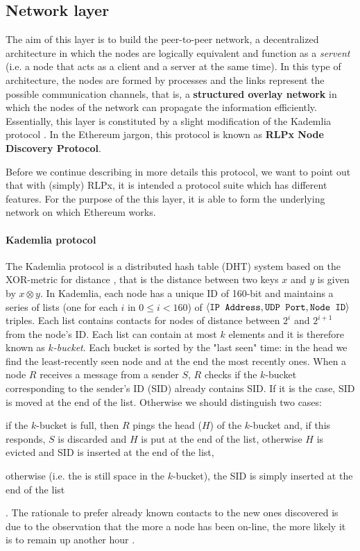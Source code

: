 \subsection{Network layer}
\label{sec:network-layer}

The aim of this layer is to build the peer-to-peer network, a decentralized
architecture in which the nodes are logically equivalent and function as a
\emph{servent} (i.e. a node that acts as a client and a server at the same
time). In this type of architecture, the nodes are formed by processes and the
links represent the possible communication channels, that is, a
\textbf{structured overlay network} \cite{van2017distributed} in which the nodes
of the network can propagate the information efficiently. Essentially, this
layer is constituted by a slight modification of the Kademlia protocol
\cite{bib:kademlia}. In the Ethereum jargon, this protocol is known as
\textbf{RLPx Node Discovery Protocol}.

Before we continue describing in more details this protocol, we want to point
out that with (simply) RLPx, it is intended a protocol suite which has different
features. For the purpose of the this layer, it is able to form the underlying
network on which Ethereum works.

\paragraph{Kademlia protocol}
The Kademlia protocol is a distributed hash table (DHT) system based on the
XOR-metric for distance \cite{bib:kademlia}, that is the distance between two
keys $x$ and $y$ is given by $x \otimes y$. In Kademlia, each node has a unique
ID of 160-bit and maintains a series of lists (one for each $i$ in $0 \leq i <
160$) of $\langle \verb|IP Address|, \verb|UDP Port|, \verb|Node ID| \rangle$
triples. Each list contains contacts for nodes of distance between $2^i$ and
$2^{i+1}$ from the node's ID. Each list can contain at most $k$ elements and it
is therefore known as \textit{$k$-bucket}. Each bucket is sorted by the "last
seen" time: in the head we find the least-recently seen node and at the end the
most recently ones. When a node $R$ receives a message from a sender $S$, $R$
checks if the $k$-bucket corresponding to the sender's ID (SID) already contains
SID. If it is the case, SID is moved at the end of the list. Otherwise we should
distinguish two cases:
\begin{enumerate*}[label=(\arabic*)]
  \item if the $k$-bucket is full, then $R$ pings the head ($H$) of the
  $k$-bucket and, if this responds, $S$ is discarded and $H$ is put at the end
  of the list, otherwise $H$ is evicted and SID is inserted at the end of the
  list,
  \item otherwise (i.e. the is still space in the $k$-bucket), the SID is simply
  inserted at the end of the list
\end{enumerate*}.
The rationale to prefer already known contacts to the new ones discovered is due
to the observation that the more a node has been on-line, the more likely it is
to remain up another hour \cite{bib:kademlia}.

